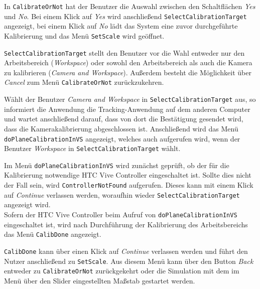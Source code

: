 In \texttt{CalibrateOrNot} hat der Benutzer die Auswahl zwischen den Schaltflächen \textit{Yes} und \textit{No}. Bei einem Klick auf \textit{Yes} wird anschließend \texttt{Select\-Calibration\-Target} angezeigt, bei einem Klick auf \textit{No} lädt das System eine zuvor durchgeführte Kalibrierung und das Menü \texttt{Set\-Scale} wird geöffnet.

\texttt{Select\-Calibration\-Target} stellt den Benutzer vor die Wahl entweder nur den Arbeitsbereich (\textit{Work\-space}) oder sowohl den Arbeitsbereich als auch die Kamera zu kalibrieren (\textit{Camera and Workspace}). Außerdem besteht die Möglichkeit über \textit{Cancel} zum Menü \texttt{Calibrate\-Or\-Not} zurückzukehren.

Wählt der Benutzer \textit{Camera and Workspace} in \texttt{Select\-Calibration\-Target} aus, so informiert die Anwendung die Tracking-Anwendung auf dem anderen Computer und wartet anschließend darauf, dass von dort die Bestätigung gesendet wird, dass die Kamerakalibrierung abgeschlossen ist. Anschließend wird das Menü \texttt{doPlane\-Calibration\-InVS} angezeigt, welches auch aufgerufen wird, wenn der Benutzer \textit{Work\-space} in \texttt{Select\-Calibration\-Target} wählt.

Im Menü \texttt{doPlane\-Calibration\-InVS} wird zunächst geprüft, ob der für die Kalibrierung notwendige HTC Vive Controller eingeschaltet ist. Sollte dies nicht der Fall sein, wird \texttt{Controller\-Not\-Found} aufgerufen. Dieses kann mit einem Klick auf \textit{Continue} verlassen werden, woraufhin wieder \texttt{Select\-Calibration\-Target} angezeigt wird.\\
Sofern der HTC Vive Controller beim Aufruf von \texttt{doPlane\-Calibration\-InVS} eingeschaltet ist, wird nach Durchführung der Kalibrierung des Arbeitsbereichs das Menü \texttt{CalibDone} angezeigt.

\texttt{Calib\-Done} kann über einen Klick auf \textit{Continue} verlassen werden und führt den Nutzer anschließend zu \texttt{SetScale}. Aus diesem Menü kann über den Button \textit{Back} entweder zu \texttt{CalibrateOrNot} zurückgekehrt oder die Simulation mit dem im Menü über den Slider eingestellten Maßstab gestartet werden.



